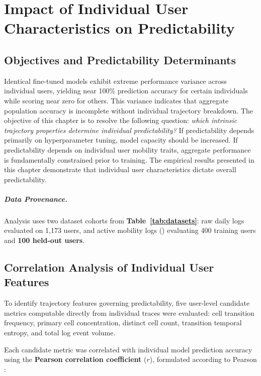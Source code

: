 \chapter{Impact of Individual User Characteristics on Predictability}
\label{ch:user}

\section{Objectives and Predictability Determinants}

Identical fine-tuned models exhibit extreme performance variance across individual users, yielding near 100\% prediction accuracy for certain individuals while scoring near zero for others. This variance indicates that aggregate population accuracy is incomplete without individual trajectory breakdown. The objective of this chapter is to resolve the following question: \emph{which intrinsic trajectory properties determine individual predictability?} If predictability depends primarily on hyperparameter tuning, model capacity should be increased. If predictability depends on individual user mobility traits, aggregate performance is fundamentally constrained prior to training. The empirical results presented in this chapter demonstrate that individual user characteristics dictate overall predictability.

\paragraph{Data Provenance.} Analysis uses two dataset cohorts from \textbf{Table~\ref{tab:datasets}}: raw daily logs evaluated on 1,173 users, and active mobility logs (\Dmob{}) evaluating 400 training users and \textbf{100 held-out users}.

\section{Correlation Analysis of Individual User Features}

To identify trajectory features governing predictability, five user-level candidate metrics computable directly from individual traces were evaluated: cell transition frequency, primary cell concentration, distinct cell count, transition temporal entropy, and total log event volume.

Each candidate metric was correlated with individual model prediction accuracy using the \textbf{Pearson correlation coefficient} ($r$), formulated according to Pearson \textbf{\cite{pearson1895correlation}}:

